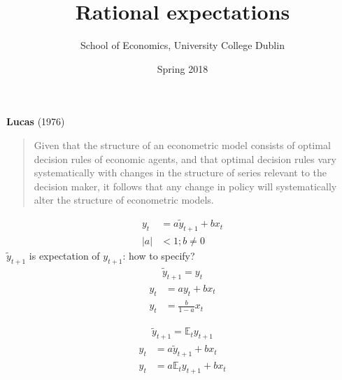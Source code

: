 \documentclass{beamer}
\title{Rational expectations}
\author{School of Economics, University College Dublin}
\date{Spring 2018}
\begin{document}
\begin{frame}
 \titlepage
\end{frame}

\begin{frame}
  \textbf{Lucas} (1976)
  \begin{quote}
  Given that the structure of an econometric model consists of optimal decision rules of economic agents, and that optimal decision rules vary systematically with changes in the structure of series relevant to the decision maker, it follows that any change in policy will systematically alter the structure of econometric models.
  \end{quote}
\end{frame}

\begin{frame}
  \begin{align}
    y_t &= a \tilde{y}_{t+1} + bx_t\\ \nonumber
    |a|&<1;b\neq0
  \end{align}
  $\tilde{y}_{t+1}$ is expectation of $y_{t+1}$: how to specify?
  \begin{align}
    \tilde{y}_{t+1}=y_t
  \end{align}
  \begin{align}
    y_t &= a y_t + bx_t\\ \nonumber
    y_t&= \frac{b}{1-a}x_t
  \end{align}
\end{frame}

\begin{frame}
  \begin{align}
    \tilde{y}_{t+1} = \mathbb{E}_ty_{t+1}
  \end{align}
  \begin{align}
  y_t &= a \tilde{y}_{t+1} + bx_t\\ \nonumber
  y_t &= a \mathbb{E}_ty_{t+1} + bx_t\\     
  \end{align}
\end{frame}
\end{document}
